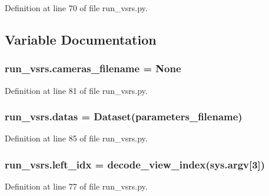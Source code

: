 Definition at line 70 of file run\+\_\+vsrs.\+py.



\subsection{Variable Documentation}
\subsubsection[{\texorpdfstring{cameras\+\_\+filename}{cameras_filename}}]{\setlength{\rightskip}{0pt plus 5cm}run\+\_\+vsrs.\+cameras\+\_\+filename = None}\hypertarget{namespacerun__vsrs_ae2016f4c5aecea18c3e0b313b26618cd}{}\label{namespacerun__vsrs_ae2016f4c5aecea18c3e0b313b26618cd}


Definition at line 81 of file run\+\_\+vsrs.\+py.

\subsubsection[{\texorpdfstring{datas}{datas}}]{\setlength{\rightskip}{0pt plus 5cm}run\+\_\+vsrs.\+datas = {\bf Dataset}({\bf parameters\+\_\+filename})}\hypertarget{namespacerun__vsrs_abed6970d28e59cb146251f3a2aa3660b}{}\label{namespacerun__vsrs_abed6970d28e59cb146251f3a2aa3660b}


Definition at line 85 of file run\+\_\+vsrs.\+py.

\subsubsection[{\texorpdfstring{left\+\_\+idx}{left_idx}}]{\setlength{\rightskip}{0pt plus 5cm}run\+\_\+vsrs.\+left\+\_\+idx = decode\+\_\+view\+\_\+index(sys.\+argv\mbox{[}3\mbox{]})}\hypertarget{namespacerun__vsrs_abe5122b51fc6f6d3cbc026cdd89ed0c0}{}\label{namespacerun__vsrs_abe5122b51fc6f6d3cbc026cdd89ed0c0}


Definition at line 77 of file run\+\_\+vsrs.\+py.

